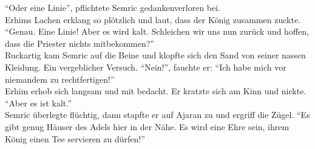 ``Oder eine Linie'', pflichtete Semric gedankenverloren bei.\\
Erhims Lachen erklang so plötzlich und laut, dass der König zusammen zuckte. 
``Genau. Eine Linie! 
Aber es wird kalt. Schleichen wir uns nun zurück und hoffen, dass die Priester 
nichts 
mitbekommen?''\\
Ruckartig kam Semric auf die Beine und klopfte sich den Sand von seiner nassen 
Kleidung. Ein 
vergeblicher Versuch. ``Nein!'', fauchte er: ``Ich habe mich vor niemandem zu 
rechtfertigen!''\\
Erhim erhob sich langsam und mit bedacht. Er kratzte sich am Kinn und nickte. 
``Aber es ist 
kalt.''\\
Semric überlegte flüchtig, dann stapfte er auf Ajaran zu und ergriff die Zügel. 
``Es gibt genug 
Häuser des Adels hier in der Nähe. Es wird eine Ehre sein, ihrem König einen 
Tee servieren zu 
dürfen!''\\



